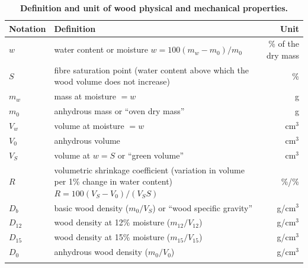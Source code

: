 \documentclass[a4paper, 12pt, leqno, dvipsnames]{article}\usepackage[]{graphicx}\usepackage[]{color}
\begin{document}
\setcounter{table}{0}
\renewcommand{\tablename}{Supporting Information}
\renewcommand{\thetable}{S\arabic{table}}
\renewcommand{\theHtable}{SuppInfo.\thetable}

\begin{longtable}{@{}lL{8cm}r@{}}
  \caption{\textbf{Definition and unit of wood physical and mechanical properties.}}\label{sm:Definitions}\\
  \toprule
  Notation & Definition & Unit \\
  \midrule
  $w$ & water content or moisture \newline $w=100 (m_w-m_0)/m_0$ & \% of the dry mass \\
  $S$ & fibre saturation point (water content above which the wood volume does not
  increase) & \% \\
  $m_w$ & mass at moisture $=w$ & g \\
  $m_0$ & anhydrous mass or ``oven dry mass'' & g \\
  $V_w$ & volume at moisture $=w$ & cm$^3$ \\
  $V_0$ & anhydrous volume & cm$^3$ \\
  $V_S$ & volume at $w=S$ or ``green volume'' & cm$^3$ \\
  $R$ & volumetric shrinkage coefficient (variation in volume
  per 1\% change in water content) \newline $R=100 (V_S-V_0) / (V_S S)$ & \%/\% \\
  $D_b$ & basic wood density ($m_0/V_S$) or ``wood specific gravity'' & g/cm$^3$ \\
  $D_{12}$ & wood density at 12\% moisture ($m_{12}/V_{12}$) & g/cm$^3$ \\
  $D_{15}$ & wood density at 15\% moisture ($m_{15}/V_{15}$) & g/cm$^3$ \\
  $D_0$ & anhydrous wood density ($m_0/V_0$) & g/cm$^3$ \\
  \bottomrule\\
\end{longtable}

\newpage
\end{document}

